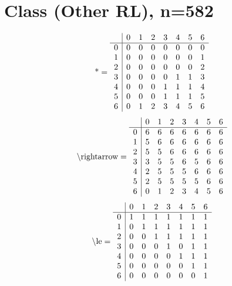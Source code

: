 \documentclass[11pt]{article}
\begin{document}
\section{Class (Other RL), n=582}
\[\text{*} = 
\begin{array}{r | r r r r r r r}
 & 0 & 1 & 2 & 3 & 4 & 5 & 6 \\ \hline
0 & 0 & 0 & 0 & 0 & 0 & 0 & 0 \\
1 & 0 & 0 & 0 & 0 & 0 & 0 & 1 \\
2 & 0 & 0 & 0 & 0 & 0 & 0 & 2 \\
3 & 0 & 0 & 0 & 0 & 1 & 1 & 3 \\
4 & 0 & 0 & 0 & 1 & 1 & 1 & 4 \\
5 & 0 & 0 & 0 & 1 & 1 & 1 & 5 \\
6 & 0 & 1 & 2 & 3 & 4 & 5 & 6 \\
\end{array}
\]
\[\text{\textbackslash rightarrow} = 
\begin{array}{r | r r r r r r r}
 & 0 & 1 & 2 & 3 & 4 & 5 & 6 \\ \hline
0 & 6 & 6 & 6 & 6 & 6 & 6 & 6 \\
1 & 5 & 6 & 6 & 6 & 6 & 6 & 6 \\
2 & 5 & 5 & 6 & 6 & 6 & 6 & 6 \\
3 & 3 & 5 & 5 & 6 & 5 & 6 & 6 \\
4 & 2 & 5 & 5 & 5 & 6 & 6 & 6 \\
5 & 2 & 5 & 5 & 5 & 5 & 6 & 6 \\
6 & 0 & 1 & 2 & 3 & 4 & 5 & 6 \\
\end{array}
\]
\[\text{\textbackslash le} = 
\begin{array}{r | r r r r r r r}
 & 0 & 1 & 2 & 3 & 4 & 5 & 6 \\ \hline
0 & 1 & 1 & 1 & 1 & 1 & 1 & 1 \\
1 & 0 & 1 & 1 & 1 & 1 & 1 & 1 \\
2 & 0 & 0 & 1 & 1 & 1 & 1 & 1 \\
3 & 0 & 0 & 0 & 1 & 0 & 1 & 1 \\
4 & 0 & 0 & 0 & 0 & 1 & 1 & 1 \\
5 & 0 & 0 & 0 & 0 & 0 & 1 & 1 \\
6 & 0 & 0 & 0 & 0 & 0 & 0 & 1 \\
\end{array}
\]
\end{document}
